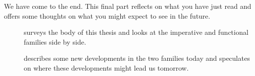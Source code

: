 \label{conclusion:overview}
We have come to the end. This final part reflects on what you have just read and offers some thoughts on what you might expect to see in the future.

\begin{description}
\item[] surveys the body of this thesis and looks at the imperative and functional families side by side.

\item[] describes some new developments in the two families today and speculates on where these developments might lead us tomorrow.

\end{description}